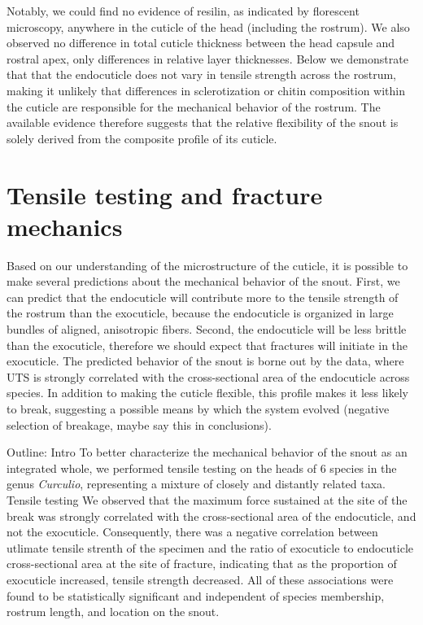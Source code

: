 \documentclass[twocolumn, linenumbers, superscriptaddress]{revtex4-1}
\begin{document}
		Notably, we could find no evidence of resilin, as indicated by florescent microscopy, anywhere in the cuticle of the head (including the rostrum).
		We also observed no difference in total cuticle thickness between the head capsule and rostral apex, only differences in relative layer thicknesses.
		Below we demonstrate that that the endocuticle does not vary in tensile strength across the rostrum, making it unlikely that differences in sclerotization or chitin composition within the cuticle are responsible for the mechanical behavior of the rostrum.
		The available evidence therefore suggests that the relative flexibility of the snout is solely derived from the composite profile of its cuticle.
	
	\section{Tensile testing and fracture mechanics} %
		Based on our understanding of the microstructure of the cuticle, it is possible to make several predictions about the mechanical behavior of the snout.
		First, we can predict that the endocuticle will contribute more to the tensile strength of the rostrum than the exocuticle, because the endocuticle is organized in large bundles of aligned, anisotropic fibers.
		Second, the endocuticle will be less brittle than the exocuticle, therefore we should expect that fractures will initiate in the exocuticle.
		The predicted behavior of the snout is borne out by the data, where UTS is strongly correlated with the cross-sectional area of the endocuticle across species.
		In addition to making the cuticle flexible, this profile makes it less likely to break, suggesting a possible means by which the system evolved (negative selection of breakage, maybe say this in conclusions).
		
		Outline:
		Intro
			To better characterize the mechanical behavior of the snout as an integrated whole, we performed tensile testing on the heads of 6 species in the genus \textit{Curculio}, representing a mixture of closely and distantly related taxa.
		Tensile testing
			We observed that the maximum force sustained at the site of the break was strongly correlated with the cross-sectional area of the endocuticle, and not the exocuticle.
			Consequently, there was a negative correlation between utlimate tensile strenth of the specimen and the ratio of exocuticle to endocuticle cross-sectional area at the site of fracture, indicating that as the proportion of exocuticle increased, tensile strength decreased.
			 All of these associations were found to be statistically significant and independent of species membership, rostrum length, and location on the snout.
			 
\end{document}
